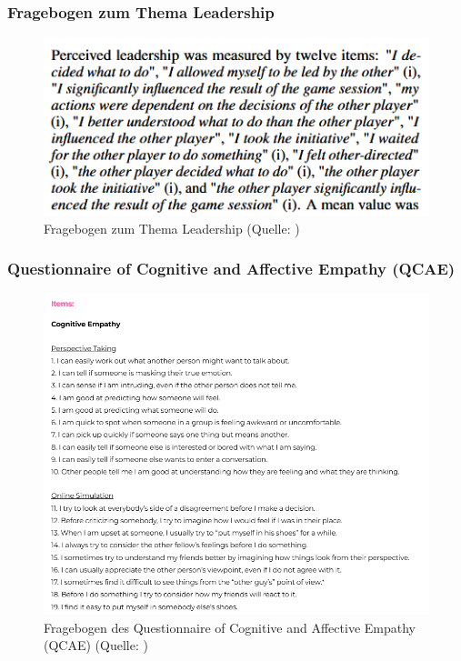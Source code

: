 \documentclass[
	12pt,
	a4paper,
	bibtotoc,
	cleardoubleempty, 
	idxtotoc,
	ngerman,
	openright
	final,
	listof=nochaptergap,
	]{scrbook}
\begin{document}
\begin{appendices}
\subsubsection{Fragebogen zum Thema Leadership}

\begin{figure}[ht]
\centering
\includegraphics[width=1\linewidth]{content/attachments/questtionaires/Leadership.PNG}
\caption{Fragebogen zum Thema Leadership (Quelle: \citealp{emmerich_game_2016})}
\label{fig:append_leadership}
\end{figure}

\subsubsection{Questionnaire of Cognitive and Affective Empathy (QCAE)}

\begin{figure}[ht]
\centering
\includegraphics[width=1\linewidth]{content/attachments/questtionaires/QCAE.PNG}
\caption{Fragebogen des Questionnaire of Cognitive and Affective Empathy (QCAE) (Quelle: \citealp{noauthor_questionnaire_nodate})}
\label{fig:append_QCAE}
\end{figure}


\end{appendices}
\end{document}
